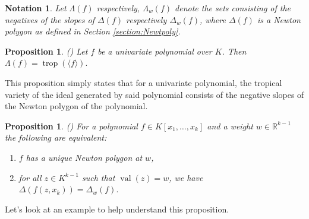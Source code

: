 \documentclass[11pt,reqno,a4paper]{article}
\theoremstyle{theoremstyle}
\newtheorem{proposition}[theorem]{Proposition}
\theoremstyle{examplestyle}
\newtheorem{notation}[theorem]{Notation}
\theoremstyle{algorithmstyle}
\numberwithin{equation}{subsection}
\newcommand{\RR}{\mathbb{R}}
\DeclareMathOperator{\trop}{trop}
\DeclareMathOperator{\val}{val}
\begin{document}
\begin{notation}
    Let $\Lambda(f)$ respectively, $\Lambda_w(f)$ denote the sets consisting of the negatives of the slopes of $\Delta(f)$ respectively $\Delta_w(f)$, where $\Delta(f)$ is a Newton polygon as defined in Section \ref{section:Newtpoly}.
\end{notation}

\begin{proposition} \label{prop:firstunique}
    (\cite[Prop. 2.7]{HR2018}) Let $f$ be a univariate polynomial over $K$. Then $\Lambda(f) = \trop(\langle f\rangle).$
\end{proposition}

This proposition simply states that for a univariate polynomial, the tropical variety of the ideal generated by said polynomial consists of the negative slopes of the Newton polygon of the polynomial.

\begin{proposition} \label{prop:ssecondunique}
    (\cite[Prop. 2.8]{HR2018}) For a polynomial $f\in K[x_1,\ldots,x_k]$ and a weight $w\in\RR^{k-1}$ the following are equivalent:
    \begin{enumerate}
        \item[(1)] $f$ has a unique Newton polygon at $w$,
        \item[(2)] for all $z\in K^{k-1}$ such that $\val(z) = w$, we have $\Delta(f(z,x_k)) = \Delta_w(f).$
    \end{enumerate}
\end{proposition}

Let's look at an example to help understand this proposition.
\end{document}
